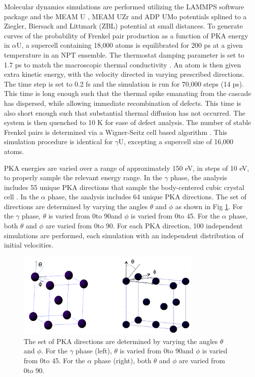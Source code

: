 \documentclass[review]{elsarticle}
\begin{document}
Molecular dynamics simulations are performed utilizing the LAMMPS \cite{plimpton1995} software package and the MEAM U \cite{beeler_meam}, MEAM UZr \cite{moore2015} and ADP UMo \cite{smirnovaADP} potentials splined to a Ziegler, Biersack and Littmark (ZBL) \cite{zbl} potential at small distances. To generate curves of the probability of Frenkel pair production as a function of PKA energy in $\alpha$U, a supercell containing 18,000 atoms is equilibrated for 200 ps at a given temperature in an NPT ensemble. The thermostat damping parameter is set to 1.7 ps to match the macroscopic thermal conductivity \cite{lane2012}. An atom is then given extra kinetic energy, with the velocity directed in varying prescribed directions. The time step is set to 0.2 fs and the simulation is run for 70,000 steps (14 ps). This time is long enough such that the thermal spike emanating from the cascade has dispersed, while allowing immediate recombination of defects. This time is also short enough such that substantial thermal diffusion has not occurred. The system is then quenched to 10 K for ease of defect analysis. The number of stable Frenkel pairs is determined via a Wigner-Seitz cell based algorithm \cite{hayward2010}. This simulation procedure is identical for $\gamma$U, excepting a supercell size of 16,000 atoms. 

PKA energies are varied over a range of approximately 150 eV, in steps of 10 eV, to properly sample the relevant energy range. In the $\gamma$ phase, the analysis includes 55 unique PKA directions that sample the body-centered cubic crystal cell \cite{beeler2015}. In the $\alpha$ phase, the analysis includes 64 unique PKA directions. The set of directions are determined by varying the angles $\theta$ and $\phi$ as shown in Fig \ref{fig:directions}. For the $\gamma$ phase, $\theta$ is varied from 0\degree to 90\degree and $\phi$ is varied from 0\degree to 45\degree. For the $\alpha$ phase, both $\theta$ and $\phi$ are varied from 0\degree to 90\degree. For each PKA direction, 100 independent simulations are performed, each simulation with an independent distribution of initial velocities. 

\begin{figure}[h]
 \centering
 \includegraphics[width=0.8\textwidth]{directions.png} %
 \caption{The set of PKA directions are determined by varying the angles $\theta$ and $\phi$. For the $\gamma$ phase (left), $\theta$ is varied from 0\degree to 90\degree and $\phi$ is varied from 0\degree to 45\degree. For the $\alpha$ phase (right), both $\theta$ and $\phi$ are varied from 0\degree to 90\degree.}
 \label{fig:directions}
\end{figure}
\end{document}
